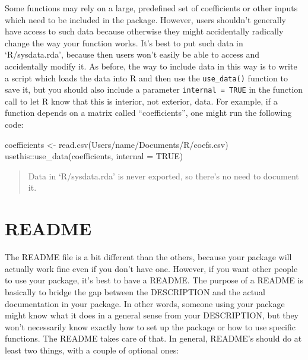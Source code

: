 \documentclass[
]{book}
\newenvironment{Shaded}{\begin{snugshade}}{\end{snugshade}}
\newcommand{\AttributeTok}[1]{\textcolor[rgb]{0.77,0.63,0.00}{#1}}
\newcommand{\ConstantTok}[1]{\textcolor[rgb]{0.00,0.00,0.00}{#1}}
\newcommand{\FunctionTok}[1]{\textcolor[rgb]{0.00,0.00,0.00}{#1}}
\newcommand{\NormalTok}[1]{#1}
\newcommand{\OtherTok}[1]{\textcolor[rgb]{0.56,0.35,0.01}{#1}}
\newcommand{\SpecialCharTok}[1]{\textcolor[rgb]{0.00,0.00,0.00}{#1}}
\newcommand{\StringTok}[1]{\textcolor[rgb]{0.31,0.60,0.02}{#1}}
\begin{document}
Some functions may rely on a large, predefined set of coefficients or other inputs which need to be included in the package. However, users shouldn't generally have access to such data because otherwise they might accidentally radically change the way your function works. It's best to put such data in `R/sysdata.rda', because then users won't easily be able to access and accidentally modify it. As before, the way to include data in this way is to write a script which loads the data into R and then use the \texttt{use\_data()} function to save it, but you should also include a parameter \texttt{internal\ =\ TRUE} in the function call to let R know that this is interior, not exterior, data. For example, if a function depends on a matrix called ``coefficients'', one might run the following code:

\begin{Shaded}
\begin{Highlighting}[]
\NormalTok{coefficients }\OtherTok{\textless{}{-}} \FunctionTok{read.csv}\NormalTok{(}\StringTok{\textquotesingle{}Users/name/Documents/R/coefs.csv\textquotesingle{}}\NormalTok{)}
\NormalTok{usethis}\SpecialCharTok{::}\FunctionTok{use\_data}\NormalTok{(coefficients, }\AttributeTok{internal =} \ConstantTok{TRUE}\NormalTok{)}
\end{Highlighting}
\end{Shaded}

\begin{quote}
Data in `R/sysdata.rda' is never exported, so there's no need to document it.
\end{quote}

\hypertarget{readme}{%
\section{README}\label{readme}}

The README file is a bit different than the others, because your package will actually work fine even if you don't have one. However, if you want other people to use your package, it's best to have a README. The purpose of a README is basically to bridge the gap between the DESCRIPTION and the actual documentation in your package. In other words, someone using your package might know what it does in a general sense from your DESCRIPTION, but they won't necessarily know exactly how to set up the package or how to use specific functions. The README takes care of that. In general, README's should do at least two things, with a couple of optional ones:
\end{document}
